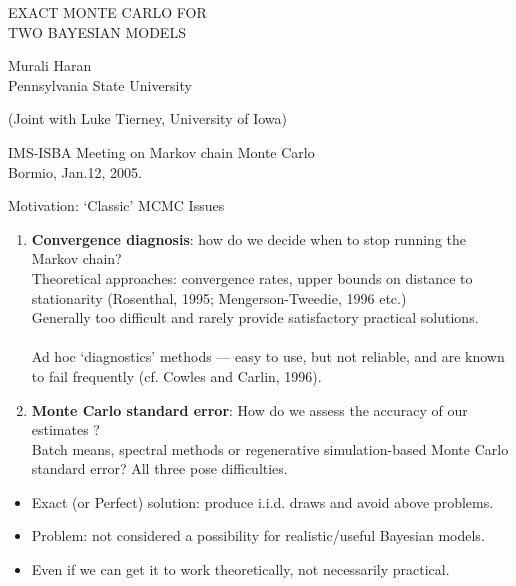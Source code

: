 \documentclass{report}
\newcommand{\head}[1]
{
  \begin{center}
      {\huge {\color{blue} #1}}
    \end{center}
  }
\begin{document}
\pagestyle{empty}
\phantom{Blah blah blah\\}
\phantom{Blah blah blah\\}
\phantom{Blah blah blah\\}
\phantom{Blah blah blah\\}
\phantom{Blah blah blah\\}
\Huge
\begin{center}
{\color{blue}   EXACT MONTE CARLO FOR\\ 
  TWO BAYESIAN MODELS\\}
\end{center}
\huge
\phantom{Blah blah blah\\}
\begin{center}
Murali Haran \\
Pennsylvania State University
\end{center}
\Large
\begin{center}
(Joint with Luke Tierney, University of Iowa)
\end{center}
\vspace{1in}
\begin{center}
IMS-ISBA Meeting on  Markov chain Monte Carlo\\
Bormio, Jan.12, 2005.
\end{center}

\newpage
\head{Motivation: `Classic' MCMC Issues} 
\begin{enumerate}
\item {\bf Convergence diagnosis}: how do we decide when to stop running the Markov chain?\\
Theoretical approaches: convergence rates, upper bounds on distance to stationarity (Rosenthal, 1995; Mengerson-Tweedie, 1996 etc.)\\
Generally too difficult and rarely provide satisfactory practical solutions.\\\\
Ad hoc `diagnostics' methods --- easy to use, but not reliable, and are known to fail frequently (cf. Cowles and Carlin, 1996).\\
\item {\bf Monte Carlo standard error}: How do we assess the accuracy of our estimates ?\\
Batch means, spectral methods or regenerative simulation-based Monte Carlo standard error? All three pose difficulties.
\end{enumerate}
\begin{itemize}
\item Exact (or Perfect) solution: produce i.i.d. draws and avoid above problems.
\item Problem: not considered a possibility for realistic/useful Bayesian models.
\item Even if we can get it to work theoretically, not necessarily practical.
\end{itemize}
\end{document}
